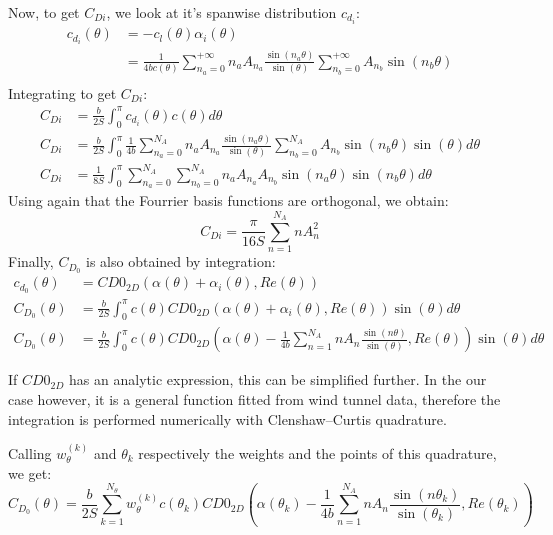 \documentclass[letterpaper,12pt]{article}
\begin{document}
\noindent Now, to get $C_{Di}$, we look at it's spanwise distribution $c_{d_i}$:
\begin{align*}
	c_{d_i} (\theta) &= - c_l (\theta) \alpha_i (\theta) \\
					&=  \frac{1}{4bc(\theta)}\sum_{n_a=0}^{+\infty} n_a A_{n_a} \frac{ \sin(n_a\theta) }{\sin(\theta)} \sum_{n_b=0}^{+\infty} A_{n_b} \sin(n_b\theta) \\
\end{align*}
Integrating to get $C_{Di}$:
\begin{align}
	C_{Di} &= \frac b {2S} \int_{0}^{\pi} c_{d_i}(\theta) c(\theta) d\theta \nonumber\\
	C_{Di} &= \frac b {2S} \int_{0}^{\pi} \frac{1}{4b}
		\sum_{n_a=0}^{N_A} n_a A_{n_a} \frac{ \sin(n_a\theta) }{\sin(\theta)} 
		\sum_{n_b=0}^{N_A} A_{n_b} \sin(n_b\theta) \sin(\theta) 
		d\theta  \nonumber \\ 
	C_{Di} &= \frac 1 {8S} \int_{0}^{\pi} \sum_{n_a=0}^{N_A} \sum_{n_b=0}^{N_A} n_a A_{n_a}A_{n_b} \sin(n_a\theta) \sin(n_b\theta) d\theta
\end{align}
Using again that the Fourrier basis functions are orthogonal, we obtain:
%
\begin{equation}
	C_{Di} = \frac {\pi}{16S} \sum_{n=1}^{N_A} n A_{n}^2
\end{equation}
%
Finally, $C_{D_0}$ is also obtained by integration:
%
\begin{align*}
	c_{d_0}(\theta) &= CD0_{2D}\left( \alpha(\theta) + \alpha_i(\theta), Re(\theta)\right) \\
	C_{D_0}(\theta) &= \frac b {2S} \int_{0}^{\pi} c(\theta) CD0_{2D}\left( \alpha(\theta) + \alpha_i(\theta), Re(\theta)\right) \sin(\theta) d\theta \\
	C_{D_0}(\theta) &= \frac b {2S} \int_{0}^{\pi} c(\theta) CD0_{2D}\left( \alpha(\theta) - \frac {1}{4b}  \sum_{n=1}^{N_A} n A_n \frac{ \sin(n\theta) }{\sin(\theta)} , Re(\theta)\right) \sin(\theta) d\theta
\end{align*}

If $CD0_{2D}$ has an analytic expression, this can be simplified further.
In the our case however, it is a general function fitted from wind tunnel data, 
therefore the integration is performed numerically with Clenshaw–Curtis quadrature. 

Calling $w_{\theta}^{(k)}$ and $\theta_k$ respectively the weights and the points of this quadrature, we get:
\begin{equation}
	C_{D_0}(\theta) = \frac b {2S} \sum_{k=1}^{N_{\theta}} w_{\theta}^{(k)} c(\theta_k) CD0_{2D}\left( \alpha(\theta_k) - \frac {1}{4b} \sum_{n=1}^{N_A} n A_n \frac{ \sin(n\theta_k) }{\sin(\theta_k)} , Re(\theta_k)\right)
\end{equation}
\end{document}
